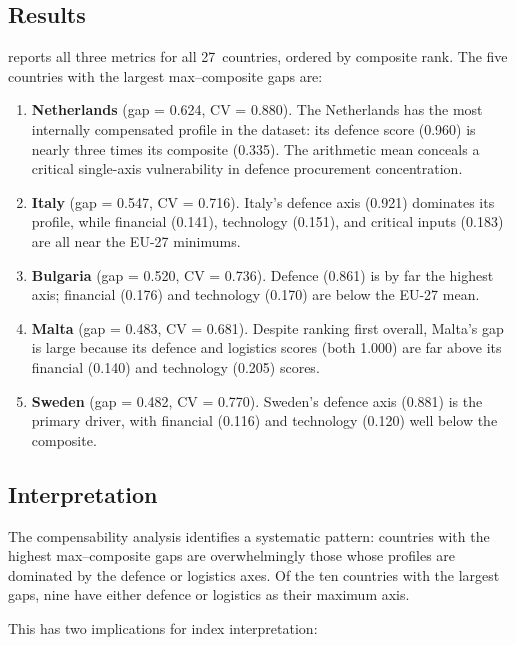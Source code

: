 \subsection{Results}



 reports all three metrics for all 27~countries,
ordered by composite rank.  The five countries with the largest
max--composite gaps are:

\begin{enumerate}[leftmargin=2em]
  \item \textbf{Netherlands} (gap = 0.624, CV = 0.880).  The
    Netherlands has the most internally compensated profile in the
    dataset: its defence score (0.960) is nearly three times its
    composite (0.335).  The arithmetic mean conceals a critical
    single-axis vulnerability in defence procurement concentration.
  \item \textbf{Italy} (gap = 0.547, CV = 0.716).  Italy's defence
    axis (0.921) dominates its profile, while financial (0.141),
    technology (0.151), and critical inputs (0.183) are all near the
    EU-27 minimums.
  \item \textbf{Bulgaria} (gap = 0.520, CV = 0.736).  Defence (0.861)
    is by far the highest axis; financial (0.176) and technology
    (0.170) are below the EU-27 mean.
  \item \textbf{Malta} (gap = 0.483, CV = 0.681).  Despite ranking
    first overall, Malta's gap is large because its defence and
    logistics scores (both 1.000) are far above its financial (0.140)
    and technology (0.205) scores.
  \item \textbf{Sweden} (gap = 0.482, CV = 0.770).  Sweden's
    defence axis (0.881) is the primary driver, with financial
    (0.116) and technology (0.120) well below the composite.
\end{enumerate}

\subsection{Interpretation}

The compensability analysis identifies a systematic pattern: countries
with the highest max--composite gaps are overwhelmingly those whose
profiles are dominated by the defence or logistics axes.  Of the ten
countries with the largest gaps, nine have either defence or logistics
as their maximum axis.

This has two implications for index interpretation:


